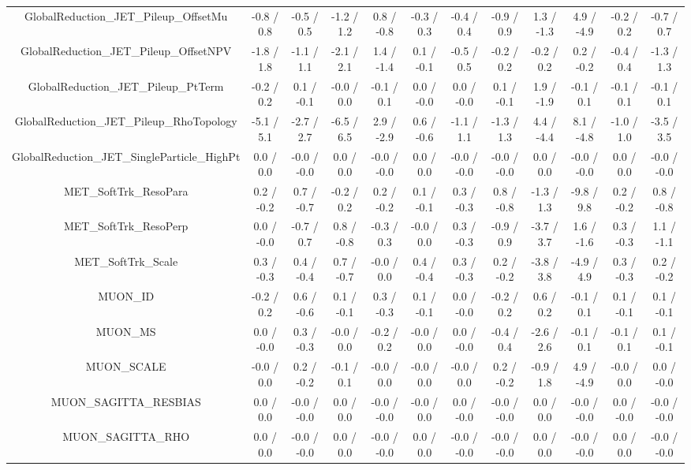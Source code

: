 \begin{table}[htbp]
\begin{center}
\begin{tabular}{|c|c|c|c|c|c|c|c|c|c|c|c|}
  GlobalReduction_JET_Pileup_OffsetMu & -0.8 / 0.8 & -0.5 / 0.5 & -1.2 / 1.2 & 0.8 / -0.8 & -0.3 / 0.3 & -0.4 / 0.4 & -0.9 / 0.9 & 1.3 / -1.3 & 4.9 / -4.9 & -0.2 / 0.2 & -0.7 / 0.7 \\ 
  GlobalReduction_JET_Pileup_OffsetNPV & -1.8 / 1.8 & -1.1 / 1.1 & -2.1 / 2.1 & 1.4 / -1.4 & 0.1 / -0.1 & -0.5 / 0.5 & -0.2 / 0.2 & -0.2 / 0.2 & 0.2 / -0.2 & -0.4 / 0.4 & -1.3 / 1.3 \\ 
  GlobalReduction_JET_Pileup_PtTerm & -0.2 / 0.2 & 0.1 / -0.1 & -0.0 / 0.0 & -0.1 / 0.1 & 0.0 / -0.0 & 0.0 / -0.0 & 0.1 / -0.1 & 1.9 / -1.9 & -0.1 / 0.1 & -0.1 / 0.1 & -0.1 / 0.1 \\ 
  GlobalReduction_JET_Pileup_RhoTopology & -5.1 / 5.1 & -2.7 / 2.7 & -6.5 / 6.5 & 2.9 / -2.9 & 0.6 / -0.6 & -1.1 / 1.1 & -1.3 / 1.3 & 4.4 / -4.4 & 8.1 / -4.8 & -1.0 / 1.0 & -3.5 / 3.5 \\ 
  GlobalReduction_JET_SingleParticle_HighPt & 0.0 / 0.0 & -0.0 / -0.0 & 0.0 / 0.0 & -0.0 / -0.0 & 0.0 / 0.0 & -0.0 / -0.0 & -0.0 / -0.0 & 0.0 / 0.0 & -0.0 / -0.0 & 0.0 / 0.0 & -0.0 / -0.0 \\ 
  MET_SoftTrk_ResoPara & 0.2 / -0.2 & 0.7 / -0.7 & -0.2 / 0.2 & 0.2 / -0.2 & 0.1 / -0.1 & 0.3 / -0.3 & 0.8 / -0.8 & -1.3 / 1.3 & -9.8 / 9.8 & 0.2 / -0.2 & 0.8 / -0.8 \\ 
  MET_SoftTrk_ResoPerp & 0.0 / -0.0 & -0.7 / 0.7 & 0.8 / -0.8 & -0.3 / 0.3 & -0.0 / 0.0 & 0.3 / -0.3 & -0.9 / 0.9 & -3.7 / 3.7 & 1.6 / -1.6 & 0.3 / -0.3 & 1.1 / -1.1 \\ 
  MET_SoftTrk_Scale & 0.3 / -0.3 & 0.4 / -0.4 & 0.7 / -0.7 & -0.0 / 0.0 & 0.4 / -0.4 & 0.3 / -0.3 & 0.2 / -0.2 & -3.8 / 3.8 & -4.9 / 4.9 & 0.3 / -0.3 & 0.2 / -0.2 \\ 
  MUON_ID & -0.2 / 0.2 & 0.6 / -0.6 & 0.1 / -0.1 & 0.3 / -0.3 & 0.1 / -0.1 & 0.0 / -0.0 & -0.2 / 0.2 & 0.6 / 0.2 & -0.1 / 0.1 & 0.1 / -0.1 & 0.1 / -0.1 \\ 
  MUON_MS & 0.0 / -0.0 & 0.3 / -0.3 & -0.0 / 0.0 & -0.2 / 0.2 & -0.0 / 0.0 & 0.0 / -0.0 & -0.4 / 0.4 & -2.6 / 2.6 & -0.1 / 0.1 & -0.1 / 0.1 & 0.1 / -0.1 \\ 
  MUON_SCALE & -0.0 / 0.0 & 0.2 / -0.2 & -0.1 / 0.1 & -0.0 / 0.0 & -0.0 / 0.0 & -0.0 / 0.0 & 0.2 / -0.2 & -0.9 / 1.8 & 4.9 / -4.9 & -0.0 / 0.0 & 0.0 / -0.0 \\ 
  MUON_SAGITTA_RESBIAS & 0.0 / 0.0 & -0.0 / -0.0 & 0.0 / 0.0 & -0.0 / -0.0 & -0.0 / 0.0 & 0.0 / -0.0 & -0.0 / -0.0 & 0.0 / 0.0 & -0.0 / -0.0 & 0.0 / -0.0 & -0.0 / -0.0 \\ 
  MUON_SAGITTA_RHO & 0.0 / 0.0 & -0.0 / -0.0 & 0.0 / 0.0 & -0.0 / -0.0 & 0.0 / 0.0 & -0.0 / -0.0 & -0.0 / -0.0 & 0.0 / 0.0 & -0.0 / -0.0 & 0.0 / 0.0 & -0.0 / -0.0 \\ 

\end{tabular}
\end{center}
\end{table}
